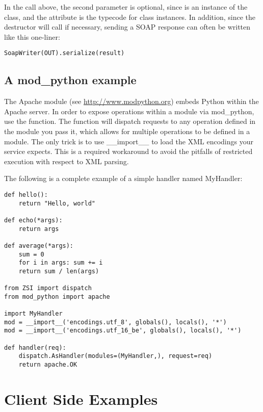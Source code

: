 In the  call above, the second parameter is optional,
since  is an instance of the 
 class, and the  attribute is
the typecode for class instances.
In addition, since the  destructor will call 
if necessary, sending a SOAP response can often be written like
this one-liner:
\begin{verbatim}
SoapWriter(OUT).serialize(result)
\end{verbatim}


\subsection{A mod_python example}

The Apache module  (see
\url{http://www.modpython.org}) embeds Python within the Apache server.
In order to expose operations within a module via mod_python, use the 
 function.  The 
function will dispatch requests to any operation defined in the module you
pass it, which allows for multiple operations to be defined in a module.
The only trick is to use __import__ to load the XML encodings your service 
expects.  This is a required workaround to avoid the pitfalls of restricted
execution with respect to XML parsing.

The following is a complete example of a simple handler named MyHandler:

\begin{verbatim}
def hello():
    return "Hello, world"

def echo(*args):
    return args

def average(*args):
    sum = 0
    for i in args: sum += i
    return sum / len(args)

from ZSI import dispatch
from mod_python import apache

import MyHandler
mod = __import__('encodings.utf_8', globals(), locals(), '*')
mod = __import__('encodings.utf_16_be', globals(), locals(), '*')

def handler(req):
    dispatch.AsHandler(modules=(MyHandler,), request=req)
    return apache.OK
\end{verbatim}


\section{Client Side Examples}

